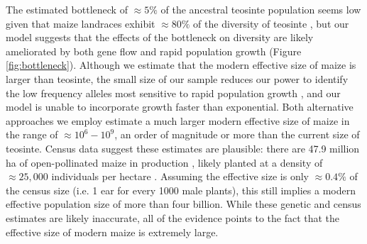 \documentclass[12pt,a4paper]{article}
\begin{document}
The estimated bottleneck of $\approx 5\%$ of the ancestral teosinte population seems low given that maize landraces exhibit $\approx 80\%$ of the diversity of teosinte \cite{hufford2012}, but our model suggests that the effects of the bottleneck on diversity are likely ameliorated by both gene flow and rapid population growth (Figure \ref{fig:bottleneck}).   
Although we estimate that the modern effective size of maize is larger than teosinte, the small size of our sample reduces our power to identify the low frequency alleles most sensitive to rapid population growth \cite{keinan2012}, and our model is unable to incorporate growth faster than exponential.  
Both alternative approaches we employ estimate a much larger modern effective size of maize in the range of $\approx 10^6 - 10^9$, an order of magnitude or more than the current size of teosinte.
Census data suggest these estimates are plausible: there are 47.9 million ha of open-pollinated maize in production \cite{cimmyt1999}, likely planted at a density of $\approx 25,000$ individuals per hectare \cite{baden2001}.
Assuming the effective size is only $\approx 0.4\%$ of the census size (i.e. 1 ear for every 1000 male plants), this still implies a modern effective population size of more than four billion.
While these genetic and census estimates are likely inaccurate, all of the evidence points to the fact that the effective size of modern maize is extremely large.
\end{document}
